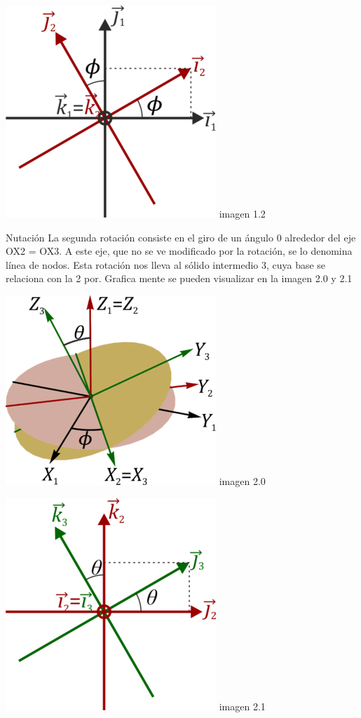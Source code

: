 \documentclass[10pt,a4paper]{article}
\begin{document}
\begin{center}
\includegraphics[scale=3.0]{imagenes/grafica.png} imagen 1.2
\end{center}
\Large Nutación
La segunda rotación consiste en el giro de un ángulo 0 alrededor del eje OX2 = OX3. A este eje, que no se ve modificado por la rotación, se lo denomina línea de nodos. Esta rotación nos lleva al sólido intermedio 3, cuya base se relaciona con la 2 por. Grafica mente se pueden visualizar en la imagen 2.0 y 2.1
\begin{center}
\includegraphics[scale=3.1]{imagenes/3D.png} imagen 2.0
\end{center}
\begin{center}
\includegraphics[scale=3.0]{imagenes/plano.png} imagen 2.1
\end{center}
\end{document}
